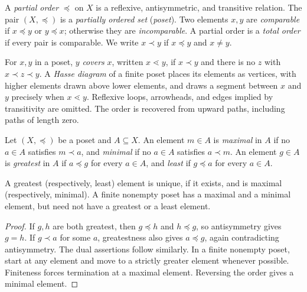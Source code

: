 \documentclass[11pt, oneside]{article}
\begin{document}
\begin{definition}
A \emph{partial order} $\preceq$ on $X$ is a reflexive, antisymmetric, and transitive relation. The pair $(X, \preceq)$ is a \emph{partially ordered set} (\emph{poset}). Two elements $x, y$ are \emph{comparable} if $x\preceq y$ or $y\preceq x$; otherwise they are \emph{incomparable}. A partial order is a \emph{total order} if every pair is comparable. We write $x\prec y$ if $x\preceq y$ and $x\ne y$.
\end{definition}

\begin{definition}
For $x, y$ in a poset, $y$ \emph{covers} $x$, written $x\lessdot y$, if $x\prec y$ and there is no $z$ with $x\prec z\prec y$. A \emph{Hasse diagram} of a finite poset places its elements as vertices, with higher elements drawn above lower elements, and draws a segment between $x$ and $y$ precisely when $x\lessdot y$. Reflexive loops, arrowheads, and edges implied by transitivity are omitted. The order is recovered from upward paths, including paths of length zero.
\end{definition}

\begin{definition}
Let $(X, \preceq)$ be a poset and $A\subseteq X$. An element $m\in A$ is \emph{maximal} in $A$ if no $a\in A$ satisfies $m\prec a$, and \emph{minimal} if no $a\in A$ satisfies $a\prec m$. An element $g\in A$ is \emph{greatest} in $A$ if $a\preceq g$ for every $a\in A$, and \emph{least} if $g\preceq a$ for every $a\in A$.
\end{definition}
\begin{proposition}
A greatest (respectively, least) element is unique, if it exists, and is maximal (respectively, minimal). A finite nonempty poset has a maximal and a minimal element, but need not have a greatest or a least element.
\end{proposition}
\begin{proof}
If $g, h$ are both greatest, then $g\preceq h$ and $h\preceq g$, so antisymmetry gives $g=h$. If $g\prec a$ for some $a$, greatestness also gives $a\preceq g$, again contradicting antisymmetry. The dual assertions follow similarly. In a finite nonempty poset, start at any element and move to a strictly greater element whenever possible. Finiteness forces termination at a maximal element. Reversing the order gives a minimal element.
\end{proof}
\end{document}
